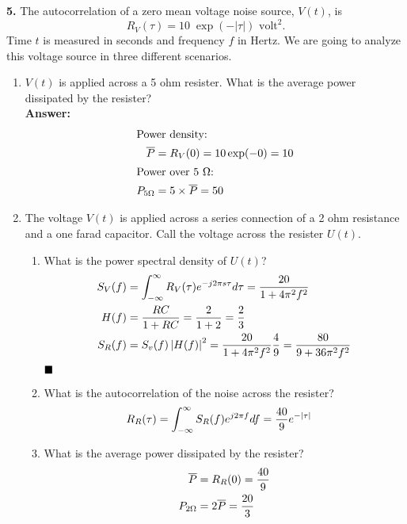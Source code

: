 \textbf{5.} The autocorrelation of a zero mean voltage noise source, $V(t)$, is
  $$ R_V (\tau ) = 10 \; \exp(-|\tau|)\mbox{ volt}^2.$$
  Time $t$ is measured in seconds and frequency $f$ in Hertz. We are going to analyze this voltage source in three different scenarios.
  \begin{enumerate}
  \item $V(t)$ is applied across a 5 ohm resister. What is the average power dissipated by the resister?\\
    \textbf{Answer:}\\
    \begin{align*}
      \shortintertext{Power density:}
      \overline{P} & = R_V(0) = 10 \exp(-0) = 10 \\
      \shortintertext{Power over 5 $\Omega$:}
      P_{5\Omega} & = 5 \times \overline{P} = 50
    \end{align*}

  \item  The voltage $V(t)$ is applied across a series connection of a 2 ohm resistance and a one farad capacitor. Call the voltage across the resister $U(t)$.
    \begin{enumerate}
    \item What is the power spectral density of $U(t)$? \\
      \begin{align*}
        S_V(f) & = \int_{-\infty}^{\infty} R_V(\tau) e^{-j 2\pi s \tau} d\tau = \dfrac{20}{1 + 4\pi^2f^2} \\
        H(f) & = \dfrac{RC}{1 + RC} = \dfrac{2}{1 + 2} = \dfrac{2}{3} \\
        S_R(f) & = S_v(f) \left| H (f) \right|^2 = \dfrac{20}{1 + 4\pi^2f^2} \dfrac{4}{9} = \dfrac{80}{9 + 36\pi^2f^2}
      \end{align*} $\hfill\blacksquare$

    \item What is the autocorrelation of the noise across the resister?\\
      \begin{align*}
        R_R(\tau) & = \int_{-\infty}^{\infty} S_R(f) e^{j2\pi f} df = \dfrac{40}{9} e^{-|\tau|}
      \end{align*}

    \item What is the average power dissipated by the resister?
      \begin{align*}
        \overline{P} & = R_R(0) = \dfrac{40}{9} \\
        P_{2\Omega} & = 2\overline{P} = \dfrac{20}{3}
      \end{align*}


\end{enumerate}
\end{enumerate}
